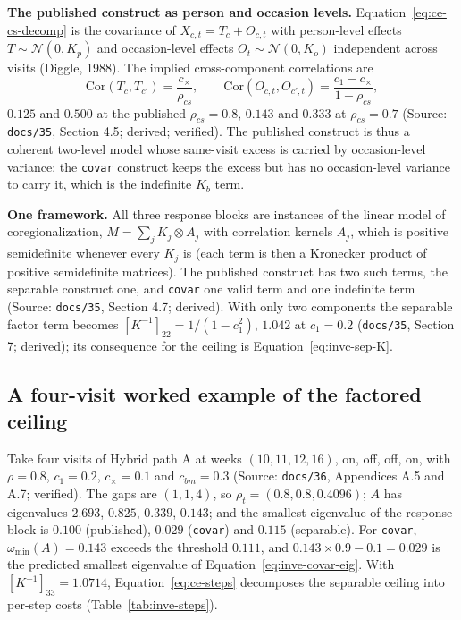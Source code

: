 \documentclass[11pt]{article}
\newcommand{\code}[1]{\texttt{#1}}
\begin{document}
\textbf{The published construct as person and occasion levels.}
Equation~\eqref{eq:ce-cs-decomp} is the covariance of
$X_{c,t} = T_c + O_{c,t}$ with person-level effects
$T \sim \mathcal N(0, K_p)$ and occasion-level effects $O_t \sim \mathcal N(0, K_o)$
independent across visits (Diggle, 1988). The implied cross-component
correlations are
\begin{equation}
\mathrm{Cor}(T_c, T_{c'}) = \frac{c_\times}{\rho_{cs}}, \qquad
\mathrm{Cor}(O_{c,t}, O_{c',t}) = \frac{c_1 - c_\times}{1 - \rho_{cs}},
\label{eq:inve-orig-levels}
\end{equation}
$0.125$ and $0.500$ at the published $\rho_{cs} = 0.8$, $0.143$ and $0.333$
at $\rho_{cs} = 0.7$ (Source: \code{docs/35}, Section 4.5; derived;
verified). The published construct is thus a coherent two-level model
whose same-visit excess is carried by occasion-level variance; the
\code{covar} construct keeps the excess but has no occasion-level
variance to carry it, which is the indefinite $K_b$ term.

\textbf{One framework.} All three response blocks are instances of the
linear model of coregionalization, $M = \sum_j K_j \otimes A_j$ with
correlation kernels $A_j$, which is positive semidefinite whenever
every $K_j$ is (each term is then a Kronecker product of positive
semidefinite matrices). The published construct has two such terms,
the separable construct one, and \code{covar} one valid term and one
indefinite term (Source: \code{docs/35}, Section 4.7; derived). With
only two components the separable factor term becomes
$[K^{-1}]_{22} = 1/(1-c_1^2)$, $1.042$ at $c_1 = 0.2$ (\code{docs/35},
Section 7; derived); its consequence for the ceiling is
Equation~\eqref{eq:invc-sep-K}.

\subsection{A four-visit worked example of the factored ceiling}
\label{sec:inve-ce-example}

Take four visits of Hybrid path A at weeks $(10, 11, 12, 16)$, on, off,
off, on, with $\rho = 0.8$, $c_1 = 0.2$, $c_\times = 0.1$ and
$c_{bm} = 0.3$ (Source: \code{docs/36}, Appendices A.5 and A.7;
verified). The gaps are $(1, 1, 4)$, so
$\rho_t = (0.8, 0.8, 0.4096)$; $A$ has eigenvalues $2.693$, $0.825$,
$0.339$, $0.143$; and the smallest eigenvalue of the response block is
$0.100$ (published), $0.029$ (\code{covar}) and $0.115$ (separable).
For \code{covar}, $\omega_{\min}(A) = 0.143$ exceeds the threshold
$0.111$, and $0.143\times0.9 - 0.1 = 0.029$ is the predicted smallest
eigenvalue of Equation~\eqref{eq:inve-covar-eig}. With
$[K^{-1}]_{33} = 1.0714$, Equation~\eqref{eq:ce-steps} decomposes the
separable ceiling into per-step costs (Table~\ref{tab:inve-steps}).
\end{document}
